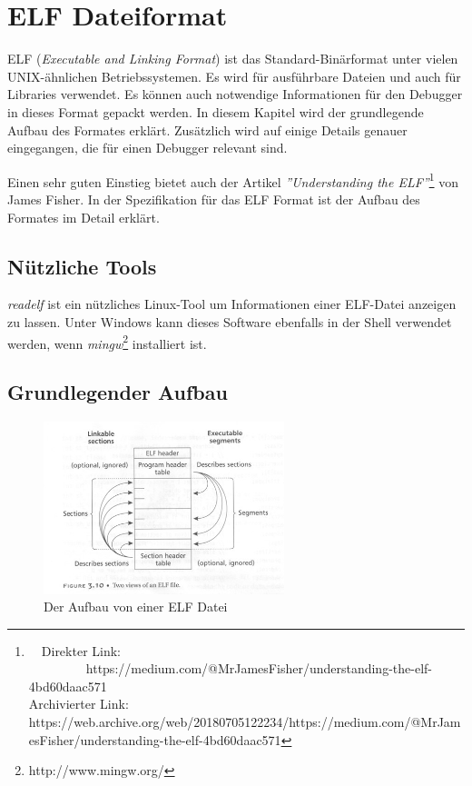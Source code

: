 \chapter{ELF Dateiformat}
ELF (\textit{Executable and Linking Format}) ist das Standard-Binärformat unter vielen UNIX-ähnlichen Betriebssystemen.
Es wird für ausführbare Dateien und auch für Libraries verwendet.
Es können auch notwendige Informationen für den Debugger in dieses Format gepackt werden.
In diesem Kapitel wird der grundlegende Aufbau des Formates erklärt.
Zusätzlich wird auf einige Details genauer eingegangen, die für einen Debugger relevant sind.

Einen sehr guten Einstieg bietet auch der Artikel \textit{''Understanding the ELF''}\footnote{\ \ Direkter Link: \ \ \ \ \ \ \ \ \ https://medium.com/@MrJamesFisher/understanding-the-elf-4bd60daac571\\ Archivierter Link: https://web.archive.org/web/20180705122234/https://medium.com/@MrJamesFisher/understanding-the-elf-4bd60daac571} von James Fisher.
In der Spezifikation für das ELF Format\cite{bib:ELFSpecification} ist der Aufbau des Formates im Detail erklärt.


\section{Nützliche Tools}
\textit{readelf} ist ein nützliches Linux-Tool um Informationen einer ELF-Datei anzeigen zu lassen.
Unter Windows kann dieses Software ebenfalls in der Shell verwendet werden, wenn \textit{mingw}\footnote{http://www.mingw.org/} installiert ist.

\section{Grundlegender Aufbau}
\begin{figure}[htbp]
	\centering
		\includegraphics[width=7cm,keepaspectratio]{images/ELFStructure.jpg}
	\caption[Der Aufbau von einer ELF Datei]{Der Aufbau von einer ELF Datei\footnotemark}
	\label{fig:ELFStructure}
\end{figure}

